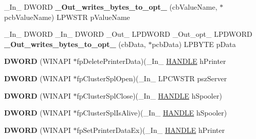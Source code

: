 \begin{DoxyCompactItemize}
\item 
\mbox{\label{struct___p_r_i_n_t_p_r_o_v_i_d_o_r_a6ae25dcb95b15cfa1e8e1193d3c4ff91}} 
\+\_\+\+In\+\_\+ D\+W\+O\+RD {\bfseries \+\_\+\+Out\+\_\+writes\+\_\+bytes\+\_\+to\+\_\+opt\+\_\+} (cb\+Value\+Name, $\ast$pcb\+Value\+Name) L\+P\+W\+S\+TR p\+Value\+Name
\item 
\mbox{\label{struct___p_r_i_n_t_p_r_o_v_i_d_o_r_ae8cbf0f2deb0f08a495a2384693996ad}} 
\+\_\+\+In\+\_\+ D\+W\+O\+RD \+\_\+\+In\+\_\+ D\+W\+O\+RD \+\_\+\+Out\+\_\+ L\+P\+D\+W\+O\+RD \+\_\+\+Out\+\_\+opt\+\_\+ L\+P\+D\+W\+O\+RD {\bfseries \+\_\+\+Out\+\_\+writes\+\_\+bytes\+\_\+to\+\_\+opt\+\_\+} (cb\+Data, $\ast$pcb\+Data) L\+P\+B\+Y\+TE p\+Data
\item 
\mbox{\label{struct___p_r_i_n_t_p_r_o_v_i_d_o_r_a35fc3c8f1675e1d92cae015473b13a74}} 
{\bfseries D\+W\+O\+RD} (W\+I\+N\+A\+PI $\ast$fp\+Delete\+Printer\+Data)(\+\_\+\+In\+\_\+ \hyperlink{interfacevoid}{H\+A\+N\+D\+LE} h\+Printer
\item 
\mbox{\label{struct___p_r_i_n_t_p_r_o_v_i_d_o_r_a537030a814fa27fc10970db2f1ee224c}} 
{\bfseries D\+W\+O\+RD} (W\+I\+N\+A\+PI $\ast$fp\+Cluster\+Spl\+Open)(\+\_\+\+In\+\_\+ L\+P\+C\+W\+S\+TR psz\+Server
\item 
\mbox{\label{struct___p_r_i_n_t_p_r_o_v_i_d_o_r_a6c588172869169feff245a3e8ab9cae2}} 
{\bfseries D\+W\+O\+RD} (W\+I\+N\+A\+PI $\ast$fp\+Cluster\+Spl\+Close)(\+\_\+\+In\+\_\+ \hyperlink{interfacevoid}{H\+A\+N\+D\+LE} h\+Spooler)
\item 
\mbox{\label{struct___p_r_i_n_t_p_r_o_v_i_d_o_r_ae4ef75497793fc71f6ea44bf3ef58377}} 
{\bfseries D\+W\+O\+RD} (W\+I\+N\+A\+PI $\ast$fp\+Cluster\+Spl\+Is\+Alive)(\+\_\+\+In\+\_\+ \hyperlink{interfacevoid}{H\+A\+N\+D\+LE} h\+Spooler)
\item 
\mbox{\label{struct___p_r_i_n_t_p_r_o_v_i_d_o_r_a81cc86fe1b54b3c902d6a97a339d0b20}} 
{\bfseries D\+W\+O\+RD} (W\+I\+N\+A\+PI $\ast$fp\+Set\+Printer\+Data\+Ex)(\+\_\+\+In\+\_\+ \hyperlink{interfacevoid}{H\+A\+N\+D\+LE} h\+Printer

\end{DoxyCompactItemize}
